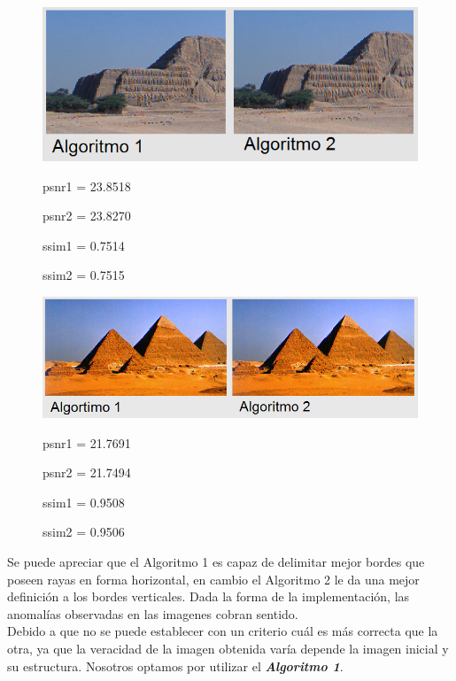\documentclass[a4paper]{article}
\begin{document}
\begin{figure}[h!]
	\caption{}
	\begin{center}
	\includegraphics[scale=0.06]{imagenes/Vecino/piramides3cmp}
	\label{Zebra}
	
	psnr1 =   23.8518

psnr2 =   23.8270

ssim1 =    0.7514

ssim2 =    0.7515
  \end{center}
\end{figure}

\begin{figure}[h!]
	\caption{}
	\begin{center}
	\includegraphics[scale=0.70]{imagenes/Vecino/piramides2cmp}
	\label{Zebra}
	
	psnr1 =   21.7691

psnr2 =   21.7494

ssim1 =    0.9508

ssim2 =    0.9506
  \end{center}
\end{figure}




Se puede apreciar que el Algoritmo 1 es capaz de delimitar mejor bordes que poseen rayas en forma horizontal, en cambio el Algoritmo 2 le da una mejor definici\'on a los bordes verticales. Dada la forma de la implementaci\'on, las anomal\'ias observadas en las imagenes cobran sentido.\\


Debido a que no se puede establecer con un criterio cu\'al es m\'as correcta que la otra, ya que la veracidad de la imagen obtenida var\'ia depende la imagen inicial y su estructura. Nosotros optamos por utilizar el \emph{\textbf{Algoritmo 1}}.\\
\end{document}
